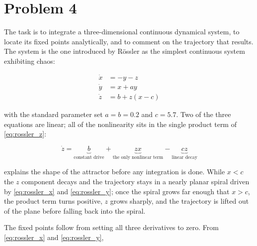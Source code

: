 
\section*{Problem 4}
{}

The task is to integrate a three-dimensional continuous dynamical system, to
locate its fixed points analytically, and to comment on the trajectory that
results. The system is the one introduced by Rössler \cite{rossler1976} as the
simplest continuous system exhibiting chaos:

\begin{subequations}
	\label{eq:rossler}
	\begin{align}
		\dot{x} &= -y - z          \label{eq:rossler_x} \\
		\dot{y} &= x + ay          \label{eq:rossler_y} \\
		\dot{z} &= b + z(x - c)    \label{eq:rossler_z}
	\end{align}
\end{subequations}

with the standard parameter set $a = b = 0.2$ and $c = 5.7$. Two of the three
equations are linear; all of the nonlinearity sits in the single product term
of \cref{eq:rossler_z}:

\begin{equation} \label{eq:nonlinear}
	\dot{z} = \underbrace{b}_{\text{constant drive}}
	         + \underbrace{zx}_{\text{the only nonlinear term}}
	         - \underbrace{cz}_{\text{linear decay}}
\end{equation}

 explains the shape of the attractor before any integration
is done. While $x < c$ the $z$ component decays and the trajectory stays in a
nearly planar spiral driven by \cref{eq:rossler_x} and \cref{eq:rossler_y};
once the spiral grows far enough that $x > c$, the product term turns positive,
$z$ grows sharply, and the trajectory is lifted out of the plane before falling
back into the spiral.

The fixed points follow from setting all three derivatives to zero. From
\cref{eq:rossler_x} and \cref{eq:rossler_y},


